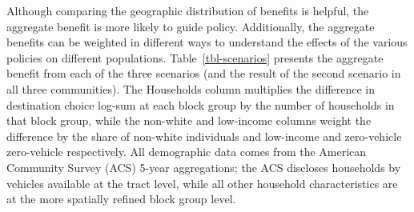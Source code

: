 \documentclass[
  letterpaper,
  number,
  review,
  3p]{elsarticle}
\begin{document}
\begin{table}

\caption{\label{tbl-scenarios}Scenario Benefits}


\end{table}%

Although comparing the geographic distribution of benefits is helpful,
the aggregate benefit is more likely to guide policy. Additionally, the
aggregate benefits can be weighted in different ways to understand the
effects of the various policies on different populations.
Table~\ref{tbl-scenarios} presents the aggregate benefit from each of
the three scenarios (and the result of the second scenario in all three
communities). The Households column multiplies the difference in
destination choice log-sum at each block group by the number of
households in that block group, while the non-white and low-income
columns weight the difference by the share of non-white individuals and
low-income and zero-vehicle zero-vehicle respectively. All demographic
data comes from the American Community Survey (ACS) 5-year aggregations;
the ACS discloses households by vehicles available at the tract level,
while all other household characteristics are at the more spatially
refined block group level.
\end{document}
